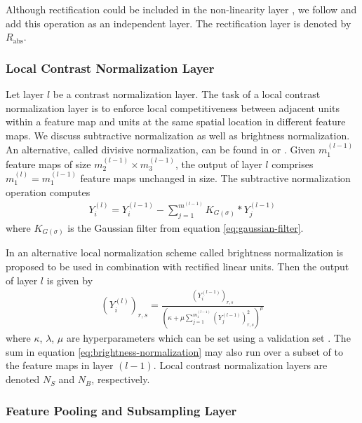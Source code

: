 Although rectification could be included in the non-linearity layer \cite{LeCunKavukvuogluFarabet:2010}, we follow \cite{JarrettKavukcuogluRanzatoLeCun:2009} and add this operation as an independent layer. The rectification layer is denoted by $R_{\text{abs}}$.

\subsubsection{Local Contrast Normalization Layer}
\label{subsubsec:contrast-normalization}

Let layer $l$ be a contrast normalization layer. The task of a local contrast normalization layer is to enforce local competitiveness between adjacent units within a feature map and units at the same spatial location in different feature maps. We discuss subtractive normalization as well as brightness normalization. An alternative, called divisive normalization, can be found in \cite{JarrettKavukcuogluRanzatoLeCun:2009} or \cite{LeCunKavukvuogluFarabet:2010}. Given $m_1^{(l-1)}$ feature maps of size $m_2^{(l-1)} \times m_3^{(l-1)}$, the output of layer $l$ comprises $m_1^{(l)} = m_1^{(l-1)}$ feature maps unchanged in size. The subtractive normalization operation computes
\begin{align}
	Y_i^{(l)} = Y_i^{(l-1)} - \sum _{j = 1}^{m^{(l-1)}} K_{G(\sigma)} \ast Y_j^{(l-1)}
\end{align}
where $K_{G(\sigma)}$ is the Gaussian filter from equation \eqref{eq:gaussian-filter}.

In \cite{KrizhevskySutskeverHinton:2012} an alternative local normalization scheme called brightness normalization is proposed to be used in combination with rectified linear units. Then the output of layer $l$ is given by
\begin{align}
\label{eq:brightness-normalization}
	\left(Y_i^{(l)}\right)_{r,s} = \frac{\left( Y_i^{(l-1)} \right)_{r,s}}{\left(\kappa + \mu \sum _{j = 1}^{m_1^{(l-1)}} \left( Y_j^{(l-1)} \right)_{r,s}^2\right)^\mu}
\end{align}
where $\kappa$, $\lambda$, $\mu$ are hyperparameters which can be set using a validation set \cite{KrizhevskySutskeverHinton:2012}. The sum in equation \eqref{eq:brightness-normalization} may also run over a subset of to the feature maps in layer $(l-1)$. Local contrast normalization layers are denoted $N_S$ and $N_B$, respectively.

\subsubsection{Feature Pooling and Subsampling Layer}
\label{subsubsec:pooling-layer}


